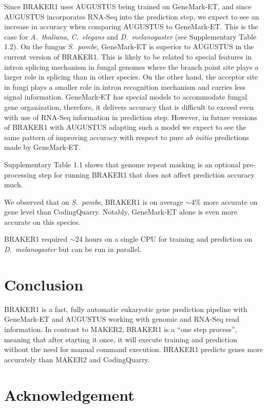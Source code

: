 \documentclass{bioinfo}
\begin{document}
Since BRAKER1 uses AUGUSTUS being trained on GeneMark-ET, and since AUGUSTUS incorporates RNA-Seq into the prediction step, we expect to see an increase in accuracy when comparing AUGUSTUS to GeneMark-ET. This is the case for \textit{A.~thaliana}, \textit{C.~elegans} and \textit{D.~melanogaster} (see Supplementary Table 1.2). On the fungus \textit{S.~pombe}, GeneMark-ET is superior to AUGUSTUS in the current version of BRAKER1. This is likely to be related to special features in intron splicing mechanism in fungal genomes where the branch point site plays a larger role in splicing than in other species. On the other hand, the acceptor site in fungi plays a smaller role in intron recognition mechanism and carries less signal information. GeneMark-ET has special models to accommodate fungal gene organization, therefore, it delivers accuracy that is difficult to exceed even with use of RNA-Seq information in prediction step. However, in future versions of BRAKER1 with AUGUSTUS adapting such a model we expect to see the same pattern of improving accuracy with respect to pure \textit{ab initio} predictions made by GeneMark-ET. 

Supplementary Table 1.1 shows that genome repeat masking is an optional pre-processing step for running BRAKER1 that does not affect prediction accuracy much. 

We observed that on \textit{S.~pombe}, BRAKER1 is on average $\sim$4\% more accurate on gene level than CodingQuarry. Notably, GeneMark-ET alone is even more accurate on this species.

BRAKER1 required $\sim$24 hours on a single CPU for training and prediction on \textit{D.~melanogaster} but can be run in parallel.

\section{Conclusion}

BRAKER1 is a fast, fully automatic eukaryotic gene prediction pipeline with GeneMark-ET and AUGUSTUS working with genomic and RNA-Seq read information. In contrast to MAKER2, BRAKER1 is a ``one step process'', meaning that after starting it once, it will execute training and prediction without the need for manual command execution. BRAKER1 predicts genes more accurately than MAKER2 and CodingQuarry.

\section*{Acknowledgement}
\end{document}
